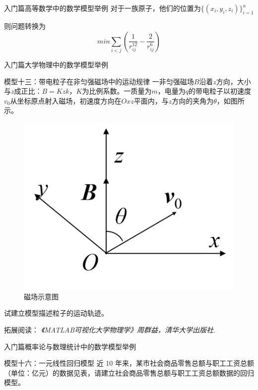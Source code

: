 \documentclass{beamer}
\begin{document}
\begin{frame}{入门篇}{高等数学中的数学模型举例}
对于一族原子，他们的位置为$\{(x_i,y_i,z_i)\}^n_{i=1}$

则问题转换为
$$min \sum\limits_{i<j}(\frac{1}{r_{ij}^{12}}-\frac{2}{r_{ij}^6})$$
\end{frame}


\begin{frame}{入门篇}{大学物理中的数学模型举例}
\begin{block}{模型十三：带电粒子在非匀强磁场中的运动规律}
一非匀强磁场$B$沿着$z$方向，大小与$z$成正比：$B = Kzk$，$K$为比例系数。一质量为$m$，电量为$q$的带电粒子以初速度$v_0$从坐标原点射入磁场，初速度方向在$Oxz$平面内，与$z$方向的夹角为$\theta$，如图所示。
\begin{figure}
  \centering
  \includegraphics[width=.3\textwidth]{figure//fig04.png} 
  \caption{磁场示意图} 
  \label{fig04} 
\end{figure}
试建立模型描述粒子的运动轨迹。

\footnotesize 拓展阅读：
\emph{《MATLAB可视化大学物理学》周群益，清华大学出版社}.
\end{block}
\end{frame}

\begin{frame}{入门篇}{概率论与数理统计中的数学模型举例}
\begin{block}{模型十六：一元线性回归模型}
近 10 年来，某市社会商品零售总额与职工工资总额（单位：亿元）的数据见表，请建立社会商品零售总额与职工工资总额数据的回归模型。

\begin{table}[h]
\centering
{}
\caption{数据}
\label{table1}
\end{table}

\end{block}
\end{frame}
\end{document}
